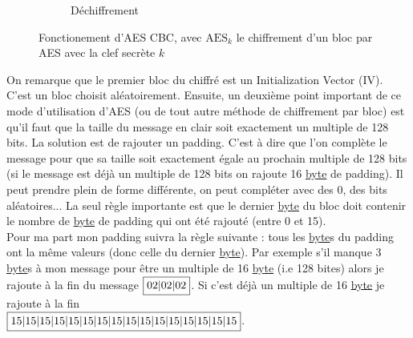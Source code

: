 \documentclass[a4paper, 12pt]{article}
\begin{document}
\begin{figure}[h]
\begin{subfigure}{\textwidth}
\caption{Déchiffrement}
\end{subfigure}
\caption{Fonctionement d'AES CBC, avec $\text{AES}_k$ le chiffrement d'un bloc par AES avec la clef secrète $k$}
\label{ilu_cbc}
\end{figure}

On remarque que le premier bloc du chiffré est un Initialization Vector (IV). C'est un bloc choisit aléatoirement. Ensuite, un deuxième point important de ce mode d'utilisation d'AES (ou de tout autre méthode de chiffrement par bloc) est qu'il faut que la taille du message en clair soit exactement un multiple de 128 bits. La solution est de rajouter un padding. C'est à dire que l'on complète le message pour que sa taille soit exactement égale au prochain multiple de 128 bits (si le message est déjà un multiple de 128 bits on rajoute 16 \hyperref[byte]{byte} de padding). Il peut prendre plein de forme différente, on peut compléter avec des $0$, des bits aléatoires... La seul règle importante est que le dernier \hyperref[byte]{byte} du bloc doit contenir le nombre de \hyperref[byte]{byte} de padding qui ont été rajouté (entre 0 et 15). \\

Pour ma part mon padding suivra la règle suivante : tous les \hyperref[byte]{byte}s du padding ont la même valeurs (donc celle du dernier \hyperref[byte]{byte}).
Par exemple s'il manque 3 \hyperref[byte]{byte}s à mon message pour être un multiple de 16 \hyperref[byte]{byte} (i.e 128 bites) alors je rajoute à la fin du message $\fbox{02|02|02}$. Si c'est déjà un multiple de 16 \hyperref[byte]{byte} je rajoute à la fin\\ $\fbox{15|15|15|15|15|15|15|15|15|15|15|15|15|15|15|15}$.\\
\end{document}
